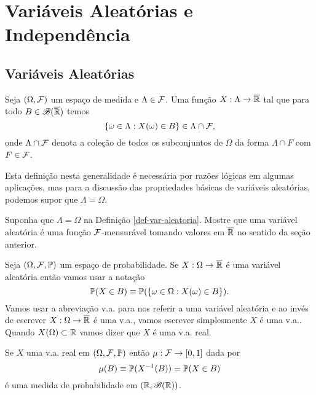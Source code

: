 \chapter[Aula 6]{Variáveis Aleatórias e Independência}
\chaptermark{}

\section{Variáveis Aleatórias}

\begin{definicao}\label{def-var-aleatoria}
Seja $(\Omega,\F)$ um espaço de medida e $\Lambda\in\F$.
Uma função $X:\Lambda\to\overline{\R}$ tal que para todo 
$B\in\mathscr{B}(\overline{\R})$ temos 
	\[
		\{\omega \in\Lambda: X(\omega)\in B\} 
		\in \Lambda\cap\F,
	\]
onde $\Lambda\cap \F$ denota a coleção de todos os 
subconjuntos de $\Omega$ da forma $\Lambda\cap F$
com $F\in\F$.
\end{definicao}

\begin{observacao}
Esta definição nesta generalidade é necessária por razões
lógicas em algumas aplicações, mas para a discussão das
propriedades básicas de variáveis aleatórias, podemos 
supor que $\Lambda =\Omega$.
\end{observacao}


\begin{exercicio}
Suponha que $\Lambda=\Omega$ na Definição \ref{def-var-aleatoria}.
Mostre que uma variável aleatória é uma função $\F$-mensurável
tomando valores em $\overline{\R}$ no sentido da seção anterior.  
\end{exercicio}

Seja $(\Omega,\F,\P)$ um espaço de probabilidade. 
Se $X:\Omega\to\overline{\R}$ é uma variável aleatória então vamos 
usar a notação
	\[
		\P(X\in B) \equiv \P(\{\omega\in\Omega: X(\omega)\in B\}).
	\]
Vamos usar a abreviação v.a. para nos referir a uma variável aleatória
e ao invés de escrever $X:\Omega\to \overline{\R}$ é uma 
v.a., vamos escrever simplesmente $X$ é uma v.a..
Quando $X(\Omega)\subset \R$ vamos dizer que $X$ é uma 
v.a. real.





\begin{proposicao}
	Se $X$ uma v.a. real em $(\Omega,\F,\P)$ então 
	$\mu:\F\to [0,1]$ dada por 
		\[
			\mu(B)\equiv \P(X^{-1}(B))=\P(X\in B)
		\]
	é uma medida de probabilidade em 
	$(\R,\mathscr{B}(\R))$.
\end{proposicao}

